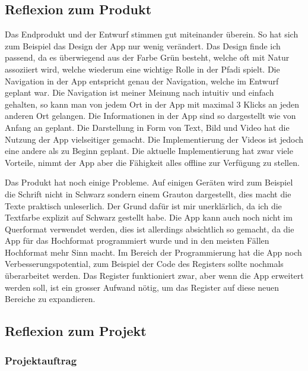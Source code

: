 \subsection{Reflexion zum Produkt}

Das Endprodukt und der Entwurf stimmen gut miteinander überein. So hat sich zum Beispiel das Design der App nur wenig verändert. Das Design finde ich passend, da es überwiegend aus der Farbe Grün besteht, welche oft mit Natur assoziiert wird, welche wiederum eine wichtige Rolle in der Pfadi spielt. Die Navigation in der App entspricht genau der Navigation, welche im Entwurf geplant war. Die Navigation ist meiner Meinung nach intuitiv und einfach gehalten, so kann man von jedem Ort in der App mit maximal 3 Klicks an jeden anderen Ort gelangen. Die Informationen in der App sind so dargestellt wie von Anfang an geplant. Die Darstellung in Form von Text, Bild und Video hat die Nutzung der App vielseitiger gemacht. Die Implementierung der Videos ist jedoch eine andere als zu Beginn geplant. Die aktuelle Implementierung hat zwar viele Vorteile, nimmt der App aber die Fähigkeit alles offline zur Verfügung zu stellen. \par
Das Produkt hat noch einige Probleme. Auf einigen Geräten wird zum Beispiel die Schrift nicht in Schwarz sondern einem Grauton dargestellt, dies macht die Texte praktisch unleserlich. Der Grund dafür ist mir unerklärlich, da ich die Textfarbe explizit auf Schwarz gestellt habe. Die App kann auch noch nicht im Querformat verwendet werden, dies ist allerdings absichtlich so gemacht, da die App für das Hochformat programmiert wurde und in den meisten Fällen Hochformat mehr Sinn macht. Im Bereich der Programmierung hat die App noch Verbesserungspotential, zum Beispiel der Code des Registers sollte nochmals überarbeitet werden. Das Register funktioniert zwar, aber wenn die App erweitert werden soll, ist ein grosser Aufwand nötig, um das Register auf diese neuen Bereiche zu expandieren. 

\subsection{Reflexion zum Projekt}

\subsubsection{Projektauftrag}

